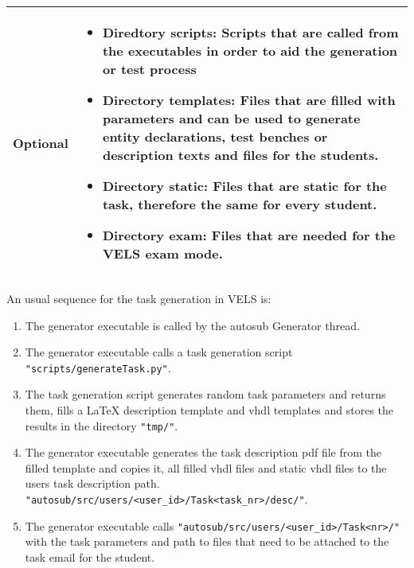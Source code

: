 \begin{tabular}{|p{3cm}|p{10cm}|}
\hline

Optional & \begin{itemize}
    \item {\bf Diredtory scripts:} Scripts that are called from the executables in order to aid the 
        generation or test process
    \item {\bf Directory templates:} Files that are filled with parameters and can be used to generate entity 
        declarations, test benches or description texts and files for the students.
    \item {\bf Directory static:} Files that are static for the task, therefore the same for every student.
    \item {\bf Directory exam:} Files that are needed for the VELS exam mode.
\end{itemize} 
\\
\hline
\end{tabular} 

An usual sequence for the task generation in VELS is:
\begin{enumerate}
    \item The generator executable is called by the autosub Generator thread.
    \item The generator executable calls a task generation script
        {\tt "scripts/generateTask.py"}.
    \item The task generation script generates random task parameters and returns
        them, fills a LaTeX description template and vhdl templates and stores
        the results in the directory {\tt "tmp/"}.
    \item The generator executable generates the task description pdf file from the
        filled template and copies it, all filled vhdl files and static vhdl files
        to the users task description path.
        {\tt "autosub/src/users/<user\_id>/Task<task\_nr>/desc/"}.
    \item The generator executable calls {\tt "autosub/src/users/<user\_id>/Task<nr>/"} 
		with the task parameters and path to files that need to be attached to the task
		email for the student.
\end{enumerate}

